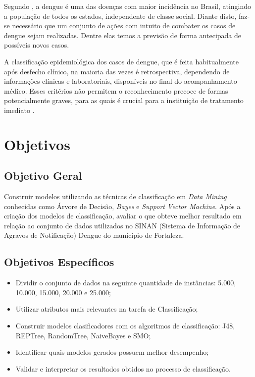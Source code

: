 \documentclass[
	12pt,				%
	openright,			%
	oneside,	
	a4paper,				%
	english,				%
	brazil				%
]{abntex2/abntex2} %
\begin{document}
		Segundo \cite{saude:2013}, a dengue é uma das doenças com maior incidência no Brasil, atingindo a população de todos os estados, independente de classe social. Diante disto, faz-se necessário que um conjunto de ações com intuito de combater os casos de dengue sejam realizadas. Dentre elas temos a previsão de forma antecipada de possíveis novos casos.

		A classificação epidemiológica dos casos de dengue, que é feita habitualmente após desfecho clínico, na maioria das vezes é retrospectiva, dependendo de informações clínicas e laboratoriais, disponíveis no final do acompanhamento médico. Esses critérios não permitem o reconhecimento precoce de formas potencialmente graves, para as quais é crucial para a instituição de tratamento imediato \cite{saude:2013}.

	\section{Objetivos}
	
		\subsection{Objetivo Geral}

		Construir modelos utilizando as técnicas de classificação em \textit{Data Mining} conhecidas como Árvore de Decisão, \textit{Bayes} e \textit{Support Vector Machine}. Após a criação dos modelos de classificação, avaliar o que obteve melhor resultado em relação ao conjunto de dados utilizados no SINAN (Sistema de Informação de Agravos de Notificação) Dengue do município de Fortaleza. 
		
		\subsection{Objetivos Específicos}
		
		\begin{itemize}
			\item Dividir o conjunto de dados na seguinte quantidade de instâncias: 5.000, 10.000, 15.000, 20.000 e 25.000;
			
			\item Utilizar atributos mais relevantes na tarefa de Classificação;
			
			\item Construir modelos clasificadores com os algoritmos de classificação: J48, REPTree, RandomTree, NaiveBayes e SMO;

			\item Identificar quais modelos gerados possuem melhor desempenho;
			
			\item Validar e interpretar os resultados obtidos no processo de classificação.
		\end{itemize}
		
\end{document}
